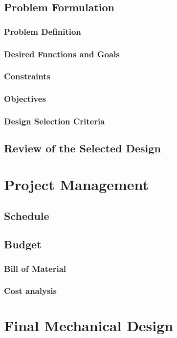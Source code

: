 \documentclass[ece]{uw-wkrpt}
\let\oldsection\section
\renewcommand\section{\clearpage\oldsection}
\begin{document}
\subsection{Problem Formulation}
\subsubsection{Problem Definition}
\subsubsection{Desired Functions and Goals}
% 
\subsubsection{Constraints}
\subsubsection{Objectives}
% 
\subsubsection{Design Selection Criteria}
% 
\subsection{Review of the Selected Design}
% 
\section{Project Management}
% 
\subsection{Schedule}
% 
\subsection{Budget}
\subsubsection{Bill of Material}
\subsubsection{Cost analysis}
% 
\section{Final Mechanical Design}
\end{document}
